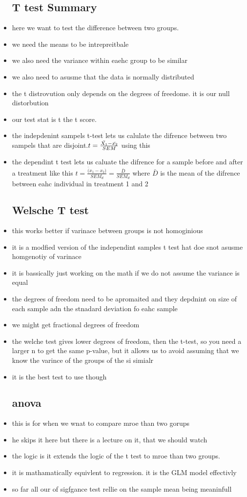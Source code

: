 \documentclass{article}
\begin{document}
\begin{itemize}
\subsection{T test Summary}
\item here we want to test the difference between two groups. 
\item we need the means to be intrepreitbale 
\item we also need the variance within eaehc group to be similar 
\item we also need to asusme that the data is normally distributed 
\item the t distrovution only depends on the degrees of freedome. it is our null distorbution 
\item our test stat is t the t score. 
\item the indepdenint sampels t-test lets us calulate the difrence between two sampels that are disjoint.$t=\frac{\Bar{X_1}-\Bar{x_2}}{SEM}$ using this 
\item the dependint t test lets us caluate the difrence for a sample before and after a treatment like this $t=\frac{\bar(x_1-x_2)}{SEM_d}=\frac{\bar{D}}{SEM_d}$ where $\bar{D}$ is the mean of the difrence between eahc individual in treatment 1 and 2 
\subsection{Welsche T test }
\item this works better if varinace between groups is not homoginious 
\item it is a modfied version of the independint samples t test hat doe snot asusme homgenotiy of varinace 
\item it is bassically just working on the math if we do not assume the variance is equal 
\item the degrees of freedom need to be apromaited and they depdnint on size of each sample adn the stnadard deviation fo eahc sample
\item we might get fractional degrees of freedom 
\item the welche test gives lower degrees of freedom, then the t-test, so you need a larger n to get the same p-value, but it allows us to avoid assuming that we know the varince of the groups of the si simialr 
\item it is the best test to use though 
\subsection{anova}
\item this is for when we wnat to compare mroe than two gorups 
\item he skips it here but there is a lecture on it, that we should watch 
\item the logic is it extends the logic of the t test to mroe than two groups. 
\item it is mathamatically equivlent to regression. it is the GLM model effectivly  \item so far all our of sigfgance test rellie on the sample mean being meaninfull 

\end{itemize}
\end{document}
